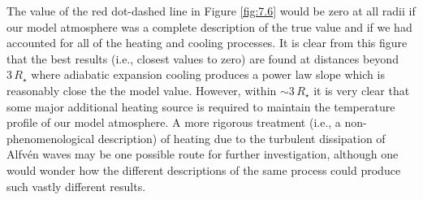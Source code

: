 The value of the red dot-dashed line in Figure \ref{fig:7.6} would be zero at all radii if our model atmosphere was a complete description of the true value and if we had accounted for all of the heating and cooling processes. It is clear from this figure that the best results (i.e., closest values to zero) are found at distances beyond  $3\,R_{\star}$ where adiabatic expansion cooling produces a power law slope which is reasonably close the the model value. However, within $\sim 3\,R_{\star}$ it is very clear that some major additional heating source is required to maintain the temperature profile of our model atmosphere. A more rigorous treatment (i.e., a non-phenomenological description) of heating due to the turbulent dissipation of Alfv\'en waves may be one possible route for further investigation, although one would wonder how the different descriptions of the same process could produce such vastly different results. 